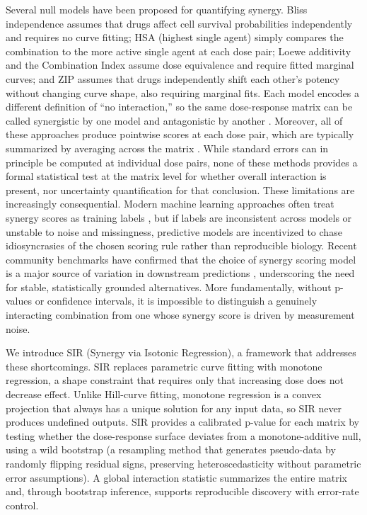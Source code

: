 \documentclass[pdflatex,sn-nature]{sn-jnl}%
\begin{document}
Several null models have been proposed for quantifying synergy.
Bliss independence \cite{Bliss1939} assumes that drugs affect cell survival probabilities independently and requires no curve fitting;
HSA (highest single agent) simply compares the combination to the more active single agent at each dose pair;
Loewe additivity \cite{Loewe1926,Tallarida2006} and the Combination Index \cite{Chou1984} assume dose equivalence and require fitted marginal curves;
and ZIP \cite{Yadav2015,SynergyFinder2017,SynergyFinder2022,DiVeroli2016} assumes that drugs independently shift each other's potency without changing curve shape, also requiring marginal fits.
Each model encodes a different definition of ``no interaction,'' so the same dose-response matrix can be called synergistic by one model and antagonistic by another \cite{Berenbaum1989,Greco1995,Foucquier2015,Meyer2020,Vlot2019}.
Moreover, all of these approaches produce pointwise scores at each dose pair, which are typically summarized by averaging across the matrix \cite{SynergyFinder2017,SynergyFinder2022}.
While standard errors can in principle be computed at individual dose pairs, none of these methods provides a formal statistical test at the matrix level for whether overall interaction is present, nor uncertainty quantification for that conclusion.
These limitations are increasingly consequential.
Modern machine learning approaches often treat synergy scores as training labels \cite{DeepSynergy2018,Kuenzi2020,Menden2019}, but if labels are inconsistent across models or unstable to noise and missingness, predictive models are incentivized to chase idiosyncrasies of the chosen scoring rule rather than reproducible biology.
Recent community benchmarks have confirmed that the choice of synergy scoring model is a major source of variation in downstream predictions \cite{Menden2019}, underscoring the need for stable, statistically grounded alternatives.
More fundamentally, without p-values or confidence intervals, it is impossible to distinguish a genuinely interacting combination from one whose synergy score is driven by measurement noise.

We introduce SIR (Synergy via Isotonic Regression), a framework that addresses these shortcomings.
SIR replaces parametric curve fitting with monotone regression, a shape constraint that requires only that increasing dose does not decrease effect.
Unlike Hill-curve fitting, monotone regression is a convex projection that always has a unique solution for any input data, so SIR never produces undefined outputs.
SIR provides a calibrated p-value for each matrix by testing whether the dose-response surface deviates from a monotone-additive null, using a wild bootstrap \cite{Wu1986} (a resampling method that generates pseudo-data by randomly flipping residual signs, preserving heteroscedasticity without parametric error assumptions).
A global interaction statistic summarizes the entire matrix and, through bootstrap inference, supports reproducible discovery with error-rate control.
\end{document}
